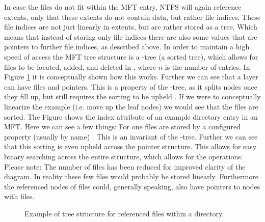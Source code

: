 In case the files do not fit within the MFT entry, NTFS will again reference extents, only that these extents do not contain data, but rather file indices. These file indices are not just linearly in extents, but are rather stored as a tree. Which means that instead of storing only file indices there are also some values that are pointers to further file indices, as described above. In order to maintain a high speed of access the MFT tree structure is a \bplus{}-tree (a sorted tree), which allows for files to be located, added, and deleted in \logn{}, where  $n$ is the number of entries. In Figure \ref{fig:b-tree} it is conceptually shown how this works. Further we can see that a layer can have files and pointers. This is a property of the \bplus-tree, as it splits nodes once they fill up, but still requires the sorting to be upheld \cite{javatpoint:2019:BT}. If we were to conceptually linearize the example (i.e. move up the leaf nodes) we would see that the files are sorted. The Figure shows the index attribute of an example directory entry in an MFT. Here we can see a few things: For one files are stored by a configured property (usually by name) \cite{B:2017:AJI5}. This is an invariant of the \bplus{}-tree. Further we can see that this sorting is even upheld across the pointer structure. This allows for easy binary searching across the entire structure, which allows for the \logn{} operations. Please note: The number of files has been reduced for improved clarity of the diagram. In reality these few files would probably be stored linearly. Furthermore the referenced nodes of files could, generally speaking, also have pointers to nodes with files.
\begin{figure}[H]
	\centering
	\caption{Example of tree structure for referenced files within a directory\label{fig:b-tree}.}
\end{figure}
